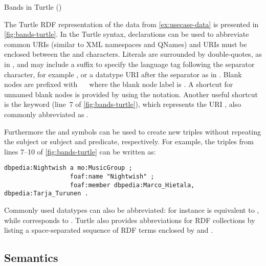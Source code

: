 %
\begin{data}[t]
  \centering
  
  \caption{Bands in Turtle ()}
\label{fig:bands-turtle}
\end{data}
%

The Turtle \ac{RDF} representation of the \usecase data from \cref{ex:usecase-data} is presented in
\cref{fig:bands-turtle}.  In the Turtle syntax,  declarations can be used to abbreviate common
URIs (similar to \ac{XML} namespaces and QNames) and URIs must be enclosed between the \character{<} and \character{>}
characters.
%
Literals are surrounded by double-quotes, as in , and may include a suffix to specify the language
tag following the  separator character, for example , or a datatype \ac{URI} after
the \character{\^{}\^{}} separator as in .
%
Blank nodes are prefixed with~\character{\_:} \eg~ where the blank node label is .  A
shortcut for unnamed blank nodes is provided by using the \character{[]} notation.  Another useful shortcut is the
 keyword (line~7 of \cref{fig:bands-turtle}), which represents the URI
, also commonly abbreviated as .


Furthermore the \character{;} and \character{,} symbols can be used to create new triples without repeating the subject
or subject and predicate, respectively.  For example, the triples from lines 7--10 of \cref{fig:bands-turtle} can
be written as:
\begin{lstlisting}[frame=none,numbers=none]
dbpedia:Nightwish a mo:MusicGroup ;
                  foaf:name "Nightwish" ; 
                  foaf:member dbpedia:Marco_Hietala, dbpedia:Tarja_Turunen .
\end{lstlisting}
%
Commonly used datatypes can also be abbreviated: for instance  is equivalent to
, while  corresponds to
.
%
Turtle also provides abbreviations for \ac{RDF} collections by listing a space-separated sequence of \ac{RDF} terms
enclosed by \lit{(} and \lit{)}.


\subsection{Semantics}
\label{sec:rdf-semantics}


